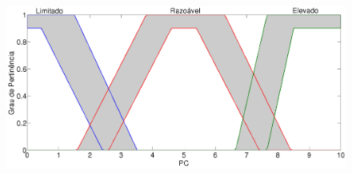 \documentclass[tcc,capa]{texufpel}
\begin{document}
\begin{figure}[h]
\centering
\includegraphics[scale=0.15]{images/Plot2_PC.png} %
 \label{fig:PC_tipo1e2}
\end{figure}
\end{document}
